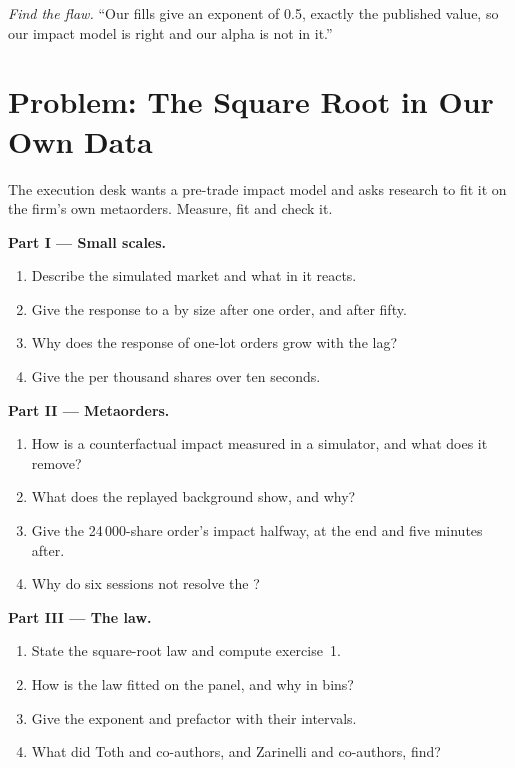 \begin{exercise}[$\star\star\star$]\label{exo:mx:the-empirics-of-price-impact:8}
\emph{Find the flaw.} ``Our fills give an exponent of 0.5, exactly the published value, so our impact model is right and our alpha is not in it.''
\end{exercise}

\section{Problem: The Square Root in Our Own Data}

\begin{problem}\label{pb:mx:the-empirics-of-price-impact:1}
The execution desk wants a pre-trade impact model and asks research to fit it on the firm's own metaorders. Measure, fit and check it.

\medskip\noindent\textbf{Part I --- Small scales.}
\begin{enumerate}
\item Describe the simulated market and what in it reacts.
\item Give the response to a  by size after one order, and after fifty.
\item Why does the response of one-lot orders grow with the lag?
\item Give the  per thousand shares over ten seconds.
\end{enumerate}

\medskip\noindent\textbf{Part II --- Metaorders.}
\begin{enumerate}[resume]
\item How is a counterfactual impact measured in a simulator, and what does it remove?
\item What does the replayed background show, and why?
\item Give the 24\,000-share order's impact halfway, at the end and five minutes after.
\item Why do six sessions not resolve the ?
\end{enumerate}

\medskip\noindent\textbf{Part III --- The law.}
\begin{enumerate}[resume]
\item State the square-root law and compute exercise~1.
\item How is the law fitted on the panel, and why in bins?
\item Give the exponent and prefactor with their intervals.
\item What did Toth and co-authors, and Zarinelli and co-authors, find?
\end{enumerate}


\end{problem}
